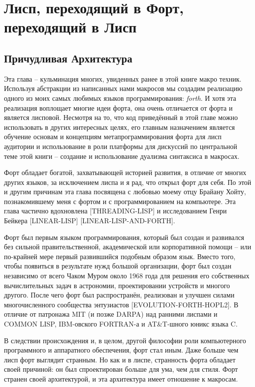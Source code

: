 \chapter{Лисп, переходящий в Форт, переходящий в Лисп}\label{chapter_lisp_forth_lisp}

\section{Причудливая Архитектура}\label{section_wird_design} 

Эта глава -- кульминация многих, увиденных ранее в этой книге макро техник. Используя абстракции из написанных нами макросов мы создадим реализацию одного из моих самых любимых языков программирования: \emph{forth}. И хотя эта реализация воплощает многие идеи форта, она очень отличается от форта и является лисповой. Несмотря на то, что код приведённый в этой главе можно использовать в других интересных целях, его главным назначением является обучение основам и концепциям метапрограммирования форта для лисп аудитории и использование в роли платформы для дискуссий по центральной теме этой книги -- создание и использование дуализма синтаксиса в макросах.

Форт обладает богатой, захватывающей историей развития, в отличие от многих других языков, за исключением лиспа и я рад, что открыл форт для себя. По этой и другим причинам эта глава посвящена с любовью моему отцу Брайану Хойту, познакомившему меня с фортом и с программированием на компьютере. Эта глава частично вдохновлена [THREADING-LISP] и исследованием Генри Бейкера [LINEAR-LISP] [LINEAR-LISP-AND-FORTH].

Форт был первым языком программирования, который был создан и развивался без сильной правительственной, академической или корпоративной помощи -- или по-крайней мере первый развившийся подобным образом язык. Вместо того, чтобы появиться в результате нужд большой организации, форт был создан независимо от всего Чаком Муром около 1968 года для решения его собственных вычислительных задач в астрономии, проектировании устройств и многого другого. После чего форт был распространён, реализован и улучшен силами многочисленного сообщества энтузиастов [EVOLUTION-FORTH-HOPL2]. В отличие от патронажа MIT (и позже DARPA) над ранними лиспами и COMMON LISP, IBM-овского FORTRAN-а и AT\&T-шного юникс языка C.

В следствии происхождения и, в целом, другой философии роли компьютерного программного и аппаратного обеспечения, форт стал иным. Даже больше чем лисп форт выглядит странным. Но как и в лиспе, странность форта обладает своей причиной: он был спроектирован больше для ума, чем для стиля. Форт странен своей архитектурой, и эта архитектура имеет отношение к макросам.

